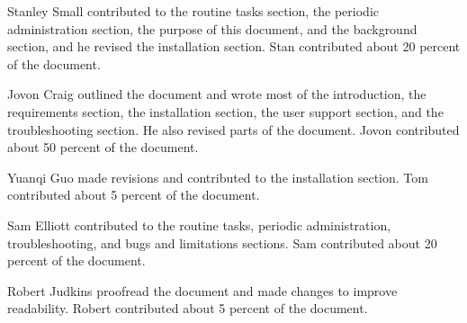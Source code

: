 \documentclass{article}
\begin{document}
Stanley Small contributed to the routine tasks section, the periodic administration section, the purpose of this document, and the background section, and he revised the installation section. Stan contributed about 20 percent of the document.

Jovon Craig outlined the document and wrote most of the introduction, the requirements section, the installation section, the user support section, and the troubleshooting section. He also revised parts of the document. Jovon contributed about 50 percent of the document.

Yuanqi Guo made revisions and contributed to the installation section. Tom contributed about 5 percent of the document.

Sam Elliott contributed to the routine tasks, periodic administration, troubleshooting, and bugs and limitations sections. Sam contributed about 20 percent of the document.

Robert Judkins proofread the document and made changes to improve readability. Robert contributed about 5 percent of the document.
\end{document}
